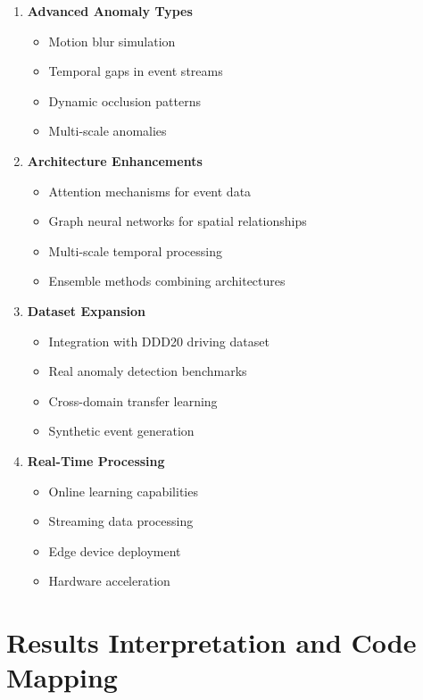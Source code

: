 \documentclass[12pt,a4paper]{article}
\begin{document}
\begin{enumerate}
    \item \textbf{Advanced Anomaly Types}
    \begin{itemize}
        \item Motion blur simulation
        \item Temporal gaps in event streams
        \item Dynamic occlusion patterns
        \item Multi-scale anomalies
    \end{itemize}
    
    \item \textbf{Architecture Enhancements}
    \begin{itemize}
        \item Attention mechanisms for event data
        \item Graph neural networks for spatial relationships
        \item Multi-scale temporal processing
        \item Ensemble methods combining architectures
    \end{itemize}
    
    \item \textbf{Dataset Expansion}
    \begin{itemize}
        \item Integration with DDD20 driving dataset
        \item Real anomaly detection benchmarks
        \item Cross-domain transfer learning
        \item Synthetic event generation
    \end{itemize}
    
    \item \textbf{Real-Time Processing}
    \begin{itemize}
        \item Online learning capabilities
        \item Streaming data processing
        \item Edge device deployment
        \item Hardware acceleration
    \end{itemize}
\end{enumerate}

\section{Results Interpretation and Code Mapping}
\end{document}
